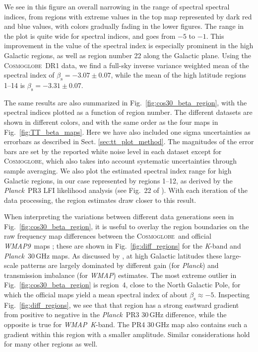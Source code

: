 \documentclass[twocolumn]{../../common/aa}
\def\WMAP{\emph{WMAP}}
\def\WMAPnine{\emph{WMAP9}}
\def\Planck{\emph{Planck}}
\newcommand{\cosmoglobe}{\textsc{Cosmoglobe}}
\newcommand{\K}[0]{\textit K}
\begin{document}
We see in this figure an overall narrowing in the range of spectral spectral indices, from regions with extreme values in the top map represented by dark red and blue values, with colors gradually fading in the lower figures. The range in the plot is quite wide for spectral indices, and goes from $-5$ to $-1$. This improvement in the value of the spectral index is especially prominent in the high Galactic regions, as well as region  number 22 along the Galactic plane.  Using the \cosmoglobe\ DR1 data, we find a full-sky inverse variance weighted mean of the spectral index of $\beta_{\mathrm{s}}=-3.07\pm0.07$, while the mean of the high latitude regions 1--14 is $\beta_{\mathrm{s}}=-3.31\pm0.07$.


The same results are also summarized in Fig.~\ref{fig:cos30_beta_region}, with the spectral indices plotted as a function of region number. The different datasets are shown in different colors, and with the same order as the four maps in Fig.~\ref{fig:TT_beta_maps}. Here we have also included one sigma uncertainties as errorbars as described in Sect. \ref{sec:tt_plot_method}. The magnitudes of the error bars are set by the reported white noise level in each dataset except for \cosmoglobe, which also takes into account systematic uncertainties through sample averaging. We also plot the estimated spectral index range for high Galactic regions, in our case represented by regions 1--12, as derived by the \Planck\ PR3 LFI likelihood analysis (see Fig.~22 of \citealp{planck2016-l05}). With each iteration of the data processing, the region estimates draw closer to this result.

When interpreting the variations between different data generations seen in Fig.~\ref{fig:cos30_beta_region}, it is useful to overlay the region boundaries on the raw frequency map differences between the \cosmoglobe\ and official \WMAPnine\ maps \citep{watts2023_dr1}; these are shown in Fig.~\ref{fig:diff_regions} for the \K-band and \Planck\ 30\,GHz maps. As discussed by \citet{watts2023_dr1}, at high Galactic latitudes these large-scale patterns are largely dominated by different gain (for \Planck) and transmission imbalance (for \WMAP) estimates. The most extreme outlier in Fig.~\ref{fig:cos30_beta_region} is region~4, close to the North Galactic Pole, for which the official maps yield a mean spectral index of about $\beta_{\mathrm{s}} \approx -5$. Inspecting Fig.~\ref{fig:diff_regions}, we see that that region has a strong eastward gradient from positive to negative in the \Planck\ PR3 30\,GHz difference, while the opposite is true for \WMAP\ \K-band. The PR4 30\,GHz map also contains such a gradient within this region with a smaller amplitude. Similar considerations hold for many other regions as well. 
\end{document}

